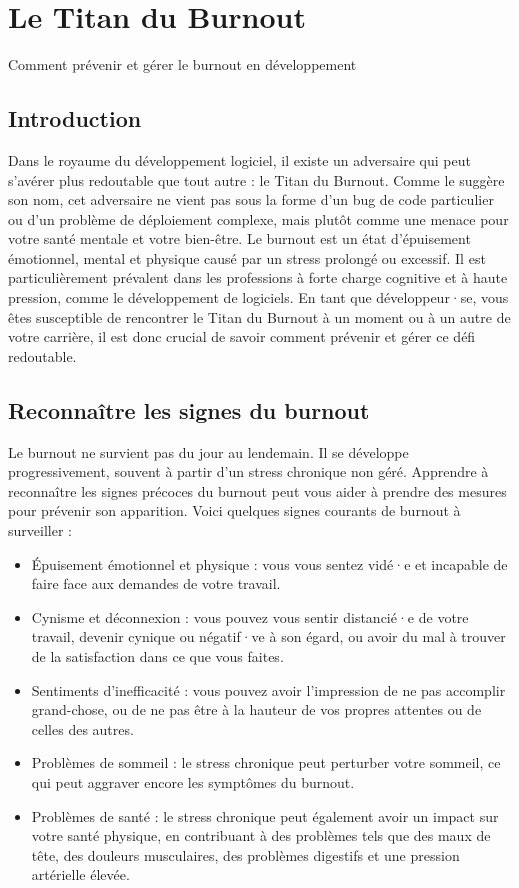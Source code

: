 \chapter{Le Titan du Burnout}
Comment prévenir et gérer le burnout en développement

\section{Introduction}

Dans le royaume du développement logiciel, il existe un adversaire qui peut s'avérer plus redoutable que tout autre : le Titan du Burnout. Comme le suggère son nom, cet adversaire ne vient pas sous la forme d'un bug de code particulier ou d'un problème de déploiement complexe, mais plutôt comme une menace pour votre santé mentale et votre bien-être. Le burnout est un état d'épuisement émotionnel, mental et physique causé par un stress prolongé ou excessif. Il est particulièrement prévalent dans les professions à forte charge cognitive et à haute pression, comme le développement de logiciels. En tant que développeur·se, vous êtes susceptible de rencontrer le Titan du Burnout à un moment ou à un autre de votre carrière, il est donc crucial de savoir comment prévenir et gérer ce défi redoutable.

\section{Reconnaître les signes du burnout}

Le burnout ne survient pas du jour au lendemain. Il se développe progressivement, souvent à partir d'un stress chronique non géré. Apprendre à reconnaître les signes précoces du burnout peut vous aider à prendre des mesures pour prévenir son apparition. Voici quelques signes courants de burnout à surveiller :

\begin{itemize}
    \item Épuisement émotionnel et physique : vous vous sentez vidé·e et incapable de faire face aux demandes de votre travail.
    \item Cynisme et déconnexion : vous pouvez vous sentir distancié·e de votre travail, devenir cynique ou négatif·ve à son égard, ou avoir du mal à trouver de la satisfaction dans ce que vous faites.
    \item Sentiments d'inefficacité : vous pouvez avoir l'impression de ne pas accomplir grand-chose, ou de ne pas être à la hauteur de vos propres attentes ou de celles des autres.
    \item Problèmes de sommeil : le stress chronique peut perturber votre sommeil, ce qui peut aggraver encore les symptômes du burnout.
    \item Problèmes de santé : le stress chronique peut également avoir un impact sur votre santé physique, en contribuant à des problèmes tels que des maux de tête, des douleurs musculaires, des problèmes digestifs et une pression artérielle élevée.
\end{itemize}

